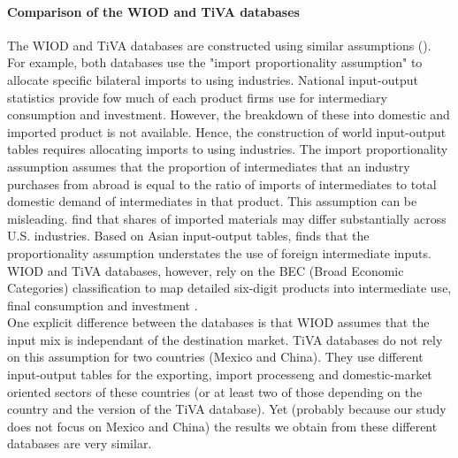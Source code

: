 \documentclass[11pt,a4paper]{article}
\begin{document}
\paragraph{Comparison of the WIOD and TiVA databases}
The WIOD and TiVA databases are constructed using similar assumptions (\cite{OECD2011,Timmer2015,OECD2018}).
For example, both databases use the "import proportionality assumption" to allocate specific bilateral imports to using industries.
National input-output statistics provide fow much of each product firms use for intermediary consumption and investment. 
However, the breakdown of these into domestic and imported product is not available. 
Hence, the construction of world input-output tables requires allocating imports to using industries.
The import proportionality assumption assumes that the proportion of intermediates that an industry purchases from abroad is equal to the ratio of imports of intermediates to total domestic demand of intermediates in that product. 
This assumption can be misleading. \cite{Feenstra2012} find that shares of imported materials may differ substantially across U.S. industries. Based on Asian input-output tables, \cite{Puzzello2012} finds that the proportionality assumption understates the use of foreign intermediate inputs. WIOD and TiVA databases, however, rely on the BEC (Broad Economic Categories) classification to map detailed six-digit products into intermediate use, final consumption and investment \citep{Dietzenbacher2013}. \\
One explicit difference between the databases is that WIOD assumes that the input mix is independant of the destination market. 
TiVA databases do not rely on this assumption for two countries (Mexico and China). They use different input-output tables for the exporting, import processeng and domestic-market oriented sectors of these countries (or at least two of those depending on the country and the version of the TiVA database). Yet (probably because our study does not focus on Mexico and China) the results we obtain from these different databases are very similar.\\
\end{document}
